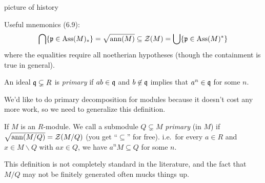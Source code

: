  \setcounter{lecture}{12}

 picture of history

 Useful mnemonics (6.9):
 \[
  \bigcap \{\mathfrak{p}\in \operatorname{Ass} (M)_*\} = \sqrt{\operatorname{ann} (M)} \subseteq   \mathcal{Z}(M) =
  \bigcup \{\mathfrak{p}\in \operatorname{Ass} (M)^*\}
 \]
 where the equalities require all noetherian hypotheses (though the containment is true
 in general).
 \begin{definition}[Lasker, 1905]
   An ideal $\mathfrak{q}\subsetneq R$ is \emph{primary} if $ab\in \mathfrak{q}$ and $b\not\in \mathfrak{q}$ implies
   that $a^n\in \mathfrak{q}$ for some $n$.
 \end{definition}
 We'd like to do primary decomposition for modules because it doesn't cost any more work,
 so we need to generalize this definition.
 \begin{definition}
   If $M$ is an $R$-module. We call a submodule $Q\subsetneq M$ \emph{primary} (in $M$) if
   $\sqrt{\operatorname{ann} (M/Q)}= \mathcal{Z}(M/Q)$ (you get ``$\subseteq$'' for free). i.e.\ for every $a\in
   R$ and $x\in M\smallsetminus Q$ with $ax\in Q$, we have $a^n M\subseteq Q$ for some
   $n$.
 \end{definition}
 \begin{warning}
   This definition is not completely standard in the literature, and the fact that $M/Q$
   may not be finitely generated often mucks things up.
 \end{warning}

